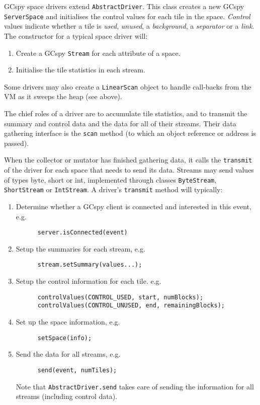 GCspy space drivers extend \texttt{AbstractDriver}. This class creates a new GCspy 
\texttt{ServerSpace}
and initialises the control values for each tile in the space. 
\emph{Control} values
indicate whether a tile is \emph{used}, \emph{unused}, a \emph{background}, a 
\emph{separator} or a \emph{link}.
The constructor for a typical space driver will:

\begin{enumerate}
\item Create a GCspy \texttt{Stream} for each attribute of a space.

\item Initialise the tile statistics in each stream.
\end{enumerate}

\noindent
Some drivers may also create a \texttt{LinearScan} object to handle call-backs 
from the VM as it sweeps the heap (see above).

The chief roles of a driver are to accumulate tile statistics, and to transmit
the summary and control data and the data for all of their streams. Their
data gathering interface is the \texttt{scan} method (to which an object 
reference or address is passed). 

When the collector or mutator has finished gathering data,
it calls the \texttt{transmit} of the driver for each space that needs to send 
its data.
Streams may send values of types byte, short or int, implemented through classes
\texttt{ByteStream}, \texttt{ShortStream} or \texttt{IntStream}. 
A driver's \texttt{transmit} method will typically:

\begin{enumerate}
\item Determine whether a GCspy client is connected and interested in
      this event, e.g. 
\begin{verbatim}
      server.isConnected(event)
\end{verbatim}
\item Setup the summaries for each stream, e.g. 
\begin{verbatim}
      stream.setSummary(values...);
\end{verbatim}

\item Setup the control information for each tile. e.g. 
\begin{verbatim}
      controlValues(CONTROL_USED, start, numBlocks);
      controlValues(CONTROL_UNUSED, end, remainingBlocks);
\end{verbatim}

\item Set up the space information, e.g. 
\begin{verbatim}
      setSpace(info);
\end{verbatim}

\item Send the data for all streams, e.g. 
\begin{verbatim}
      send(event, numTiles);
\end{verbatim}
      Note that \texttt{AbstractDriver.send} takes care of sending the 
      information for all streams (including control data).
\end{enumerate}


